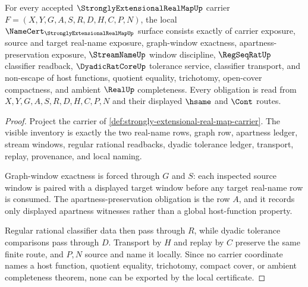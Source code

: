 \begin{theorem}
\label{thm:strongly-extensional-real-map-namecert-obligations}
For every accepted $\StronglyExtensionalRealMapUp$ carrier $F=(X,Y,G,A,S,R,D,H,C,P,N)$, the local $\NameCert_{\StronglyExtensionalRealMapUp}$ surface consists exactly of carrier exposure, source and target real-name exposure, graph-window exactness, apartness-preservation exposure, $\StreamNameUp$ window discipline, $\RegSeqRatUp$ classifier readback, $\DyadicRatCoreUp$ tolerance service, classifier transport, and non-escape of host functions, quotient equality, trichotomy, open-cover compactness, and ambient $\RealUp$ completeness. Every obligation is read from $X,Y,G,A,S,R,D,H,C,P,N$ and their displayed $\hsame$ and $\Cont$ routes.
\end{theorem}
\begin{proof}
Project the carrier of \autoref{def:strongly-extensional-real-map-carrier}. The visible inventory is exactly the two real-name rows, graph row, apartness ledger, stream windows, regular rational readbacks, dyadic tolerance ledger, transport, replay, provenance, and local naming.

Graph-window exactness is forced through $G$ and $S$: each inspected source window is paired with a displayed target window before any target real-name row is consumed. The apartness-preservation obligation is the row $A$, and it records only displayed apartness witnesses rather than a global host-function property.

Regular rational classifier data then pass through $R$, while dyadic tolerance comparisons pass through $D$. Transport by $H$ and replay by $C$ preserve the same finite route, and $P,N$ source and name it locally. Since no carrier coordinate names a host function, quotient equality, trichotomy, compact cover, or ambient completeness theorem, none can be exported by the local certificate.
\end{proof}

